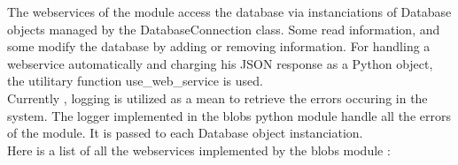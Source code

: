 The webservices of the module access the database via instanciations of Database objects managed by the DatabaseConnection class. Some read information, and some modify the database by adding or removing information. For handling a webservice automatically and charging his JSON response as a Python object, the utilitary function use\_web\_service is used.\\

Currently , logging is utilized as a mean to retrieve the errors occuring in the system. The logger implemented in the blobs python module handle all the errors of the module. It is passed to each Database object instanciation.\\

Here is a list of all the webservices implemented by the blobs module : \\


